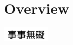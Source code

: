 \documentclass[a4paper,12pt,%
onecolumn,oneside,%
british%
]{memoir}
\providecommand{\href}[2]{#2}
\renewcommand*{\|}[1][]{\nonscript\:#1\vert\nonscript\:\mathopen{}}
\newcommand*{\furl}[2]{\href{#1}{#2}\pagenote{\url{#1}}}
\begin{document}
%
%
%
%
%
%
%


\printpagenotes*
\cleartooddpage
\chapter{Overview}
\label{cha:overview}

\epigraph{}{\includegraphics[height=2em]{images/jijimuge.pdf}}
\end{document}
